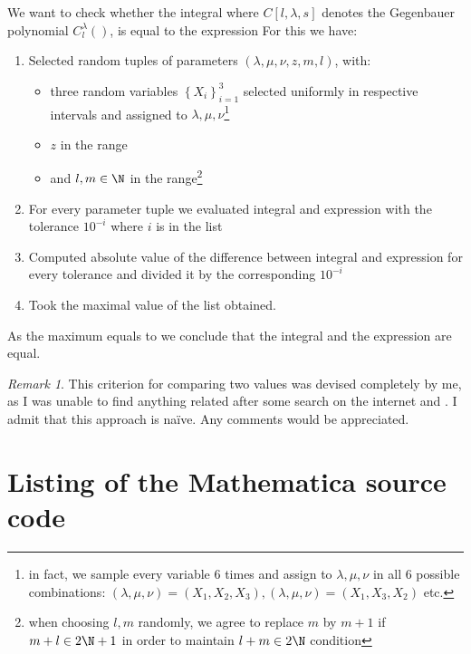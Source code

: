 \documentclass[a4paper]{article}
\theoremstyle{remark}
\newtheorem{remark}{Remark}
\begin{document}
We want to check whether the integral
where $C[l,\lambda,s]$ denotes the Gegenbauer polynomial $C^\lambda_l()$,
is equal to the expression
For this we have:
\begin{enumerate}
	\item 
Selected 
random tuples of parameters $(\lambda,\mu,\nu,z,m,l)$, with:\begin{itemize}
	\item 
		three random variables $\left\{ X_i \right\}_{i=1}^3$ selected uniformly in respective intervals
		and assigned to $\lambda,\mu,\nu$\footnote{in fact, we sample every variable 6 times and assign to $\lambda,\mu,\nu$ in all 6 possible combinations:
		$(\lambda,\mu,\nu)=\left( X_1,X_2,X_3 \right),\left( \lambda,\mu,\nu \right)=\left( X_1,X_3,X_2 \right)$ etc.}
	\item
$z$ in the range
	\item
and $l,m\in\N$ in the range\footnote{when choosing $l,m$ randomly, we agree to replace $m$ by $m+1$ if $m+l\in2\N+1$ in order to maintain $l+m\in2\N$ condition}

\end{itemize}
\item For every parameter tuple we evaluated integral and expression with the tolerance $10^{-i}$ where $i$ is in the list
\item Computed absolute value of the difference between integral and expression for every tolerance and divided it by the corresponding $10^{-i}$
\item Took the maximal value of the list obtained.
\end{enumerate}
As the maximum equals to
we conclude that the integral and the expression are equal.
\begin{remark}
	This criterion for comparing two values was devised completely by me, as I was unable to find anything related after some search on the internet and \cite{teukolsky1992numerical}.
	I admit that this approach is na\"ive. Any comments would be appreciated.
\end{remark}
	\appendix
	\section{Listing of the Mathematica source code}
	
	
	
\end{document}
